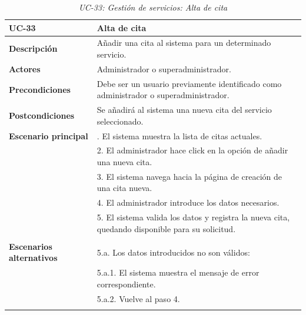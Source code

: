 \begin{table}
  \begin{center}
    \begin{tabularx}{16.4cm}{|l|X|}
      \hline
      \textbf{UC-33} & \textbf{Alta de cita}\\
      \hline
      \textbf{Descripción} & Añadir una cita al sistema para un determinado servicio.\\
      \hline
      \textbf{Actores} & Administrador o superadministrador.\\
      \hline
      \textbf{Precondiciones} & Debe ser un usuario previamente identificado como administrador o superadministrador.\\
      \hline
      \textbf{Postcondiciones} & Se añadirá al sistema una nueva cita del servicio seleccionado.\\
      \hline
      \textbf{Escenario principal} & \smallskip 1. El sistema muestra la lista de citas actuales.\\
      & 2. El administrador hace click en la opción de añadir una nueva cita.\\
      & 3. El sistema navega hacia la página de creación de una cita nueva.\\
      & 4. El administrador introduce los datos necesarios.\\
      & 5. El sistema valida los datos y registra la nueva cita, quedando disponible para su solicitud.\\
      & \\
      \hline
      \textbf{Escenarios alternativos} & \smallskip 5.a. Los datos introducidos no son válidos:\\
      & \hspace{0.3cm} 5.a.1. El sistema muestra el mensaje de error correspondiente.\\
      & \hspace{0.3cm} 5.a.2. Vuelve al paso 4.\\
      & \\
      \hline
    \end{tabularx}
    \caption{\textit{UC-33: Gestión de servicios: Alta de cita}}
    \label{tab:CU-alta-cita}
  \end{center}
\end{table}


